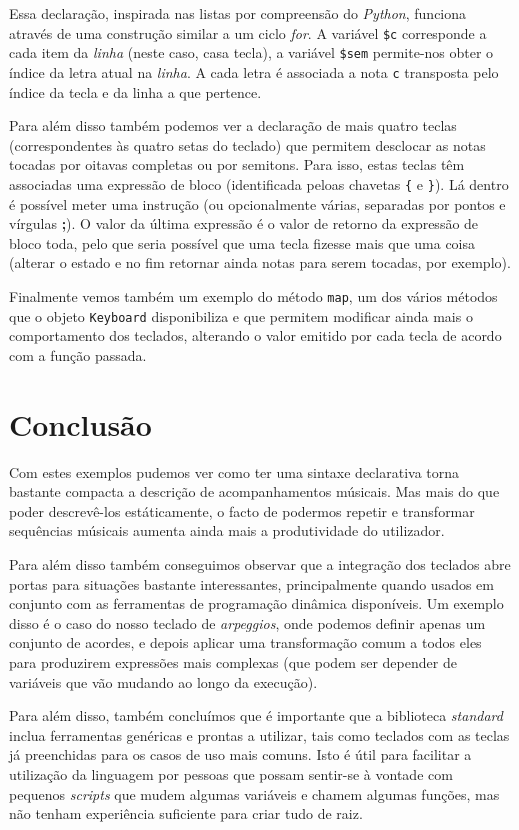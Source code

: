 Essa declaração, inspirada nas listas por compreensão do \textit{Python}, funciona através de uma construção similar a um ciclo \textit{for}. A variável \texttt{\$c} corresponde a cada item da \textit{linha} (neste caso, casa tecla), a variável \texttt{\$sem} permite-nos obter o índice da letra atual na \textit{linha}. A cada letra é associada a nota \texttt{c} transposta pelo índice da tecla e da linha a que pertence.

Para além disso também podemos ver a declaração de mais quatro teclas (correspondentes às quatro setas do teclado) que permitem desclocar as notas tocadas por oitavas completas ou por semitons. Para isso, estas teclas têm associadas uma expressão de bloco (identificada peloas chavetas \texttt{\{} e \texttt{\}}). Lá dentro é possível meter uma instrução (ou opcionalmente várias, separadas por pontos e vírgulas \textbf{;}). O valor da última expressão é o valor de retorno da expressão de bloco toda, pelo que seria possível que uma tecla fizesse mais que uma coisa (alterar o estado e no fim retornar ainda notas para serem tocadas, por exemplo).

Finalmente vemos também um exemplo do método \texttt{map}, um dos vários métodos que o objeto \texttt{Keyboard} disponibiliza e que permitem modificar ainda mais o comportamento dos teclados, alterando o valor emitido por cada tecla de acordo com a função passada.

\needspace{.2\textheight}

\section{Conclusão}
Com estes exemplos pudemos ver como ter uma sintaxe declarativa torna bastante compacta a descrição de acompanhamentos músicais. Mas mais do que poder descrevê-los estáticamente, o facto de podermos repetir e transformar sequências músicais aumenta ainda mais a produtividade do utilizador.

Para além disso também conseguimos observar que a integração dos teclados abre portas para situações bastante interessantes, principalmente quando usados em conjunto com as ferramentas de programação dinâmica disponíveis. Um exemplo disso é o caso do nosso teclado de \textit{arpeggios}, onde podemos definir apenas um conjunto de acordes, e depois aplicar uma transformação comum a todos eles para produzirem expressões mais complexas (que podem ser depender de variáveis que vão mudando ao longo da execução).

Para além disso, também concluímos que é importante que a biblioteca \textit{standard} inclua ferramentas genéricas e prontas a utilizar, tais como teclados com as teclas já preenchidas para os casos de uso mais comuns. Isto é útil para facilitar a utilização da linguagem por pessoas que possam sentir-se à vontade com pequenos \textit{scripts} que mudem algumas variáveis e chamem algumas funções, mas não tenham experiência suficiente para criar tudo de raiz.


